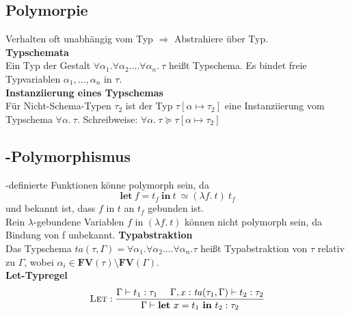 \subsection{Polymorpie}
Verhalten oft unabhängig vom Typ \(\Rightarrow\) Abstrahiere über Typ.\\
\textbf{Typschemata}\\
Ein Typ der Gestalt \(\forall \alpha_1. \forall \alpha_2. \ldots \forall \alpha_n.\ \tau\) heißt Typschema.
Es bindet freie Typvariablen \(\alpha_1,\ldots,\alpha_n\) in \(\tau\).\\
\textbf{Instanziierung eines Typschemas}\\
Für Nicht-Schema-Typen \(\tau_2\) ist der Typ \(\tau[\alpha \mapsto \tau_2]\) eine Instanziierung vom
Typschema \(\forall \alpha.\ \tau\). Schreibweise: \(\forall \alpha.\ \tau \succeq \tau [\alpha \mapsto \tau_2]\)

\subsection{-Polymorphismus}
-definierte Funktionen könne polymorph sein, da
\[\mathbf{let}\ f = t_f\ \mathbf{in}\ t\ \simeq (\lambda f.\ t)\ t_f\]
und bekannt ist, dass \(f\) in \(t\) an \(t_f\) gebunden ist.\\
Rein \(\lambda\)-gebundene Variablen \(f\) in \((\lambda f.\ t)\) können nicht polymorph sein, da Bindung von f unbekannt.
\textbf{Typabstraktion}\\
Das Typschema \(\mathit{ta}(\tau, \Gamma) = \forall \alpha_1. \forall \alpha_2. \ldots \forall \alpha_n. \tau\) heißt Typabstraktion
von \(\tau\) relativ zu \(\Gamma\), wobei \(\alpha_i \in \mathbf{FV}(\tau) \setminus \mathbf{FV}(\Gamma)\).\\
\textbf{Let-Typregel}\\
\begin{align*}
  \textsc{Let}: \frac{\Gamma \vdash t_1: \tau_1\ \ \ \ \Gamma, x: \mathit{ta}(\tau_1, \Gamma) \vdash t_2: \tau_2}{\Gamma \vdash \mathbf{let}\ x = t_1\ \mathbf{in}\ t_2: \tau_2}
\end{align*}